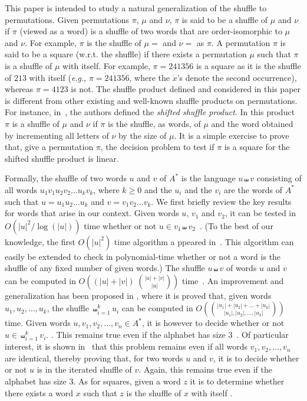 \documentclass[a4paper]{llncs}
\begin{document}
This paper is intended to study a natural generalization of the shuffle
to permutations. Given permutations $\pi$, $\mu$ and $\nu$, $\pi$ is
said to be a shuffle of $\mu$ and $\nu$ if $\pi$ (viewed as a word) is
a shuffle of two words that are order-isomorphic to $\mu$ and $\nu$. For
example, $\pi$ is the shuffle of $\mu=$ and $\nu=$ as $\pi$. A
permutation $\pi$ is said to be a square (w.r.t. the shuffle) if there
exists a permutation $\mu$ such that $\pi$ is a shuffle of $\mu$ with
itself. For example, $\pi = 241356$ is a square as it is the shuffle of
$213$ with itself (\emph{e.g.},
$\pi = \dot{2}{4}\dot{1}{3}{5}\dot{6}$, where the $\dot{x}$'s
denote the second occurrence), whereas $\pi = 4123$ is not.
The shuffle product defined and considered in this paper is different
from other existing and well-known shuffle products on permutations.
For instance, in~\cite{DHT:IJAC:2002}, the authors defined the
{\em shifted shuffle product}. In this product $\pi$ is a shuffle of
$\mu$ and $\nu$ if $\pi$ is the shuffle, as words, of $\mu$ and the
word obtained by incrementing all letters of $\nu$ by the size of $\mu$.
It is a simple exercise to prove that, give a permutation $\pi$, the
decision problem to test if $\pi$ is a square for the shifted shuffle
product is linear.
\smallskip

Formally, the shuffle of two words $u$ and $v$ of $A^*$ is the language
$u \shuffle v$ consisting of all words $u_1 v_1 u_2 v_2 \ldots u_k v_k$,
where $k \geq 0$ and the $u_i$ and the $v_i$ are the words  of $A^*$
such that $u = u_1 u_2 \ldots u_k$ and $v = v_1 v_2 \ldots v_k$. We
first briefly review the key results for words that arise in our context.
Given words $u$, $v_1$ and $v_2$, it can be tested in
$O\left(|u|^2 / \log(|u|)\right)$ time whether or not
$u \in v_1 \shuffle v_2$~\cite{Leeuwen:Nivat:IPL:1982}.
(To the best of our knowledge, the first $O(|u|^2)$ time algorithm a
ppeared in~\cite{Mansfield:DAM:1983}. This algorithm can easily be
extended to check in polynomial-time whether or not a word is the
shuffle of any fixed number of given words.) The shuffle $u \shuffle v$
of words $u$ and $v$ can be computed in
$O\left((|u|+|v|) \; \binom{|u|+|v|}{|u|}\right)$ time~\cite{Spehner:TCS:1986}.
An improvement and generalization has been proposed in
\cite{Allauzen:IGM:2000}, where it is proved that, given words
$u_1, u_2, \ldots, u_k$, the shuffle $\shuffle_{i=1}^{k} u_i$ can be
computed in
$O\left(\binom{|u_1|+|u_2|+\ldots+|u_k|}{|u_1|,|u_2|,\ldots,|u_k|}\right)$
time. Given words $u, v_1, v_2, \ldots, v_n \in A^*$, it is however \NPC
to decide whether or not $u \in \shuffle_{i=1}^{k} v_i$.
\cite{Mansfield:DAM:1983,Warmuth:Haussler:JCSS:1984}.
This remains true even if the alphabet has size $3$~\cite{Warmuth:Haussler:JCSS:1984}.
Of particular interest,
it is shown in~\cite{Warmuth:Haussler:JCSS:1984} that this problem remains
\NPC even if all
words $v_1, v_2, \ldots, v_n$ are identical,
thereby proving that,
for two words $u$ and $v$, it is \NPC to decide whether or not $u$
is in the iterated shuffle of $v$.
Again, this remains true even if the alphabet has size $3$.
As for squares, given a word $z$ it is \NPC to determine whether
there exists a word $x$ such that $z$ is the shuffle of $x$ with itself
\cite{Buss:Soltys:2014,Rizzi:Vialette:CSR:2013}.
\smallskip
\end{document}
